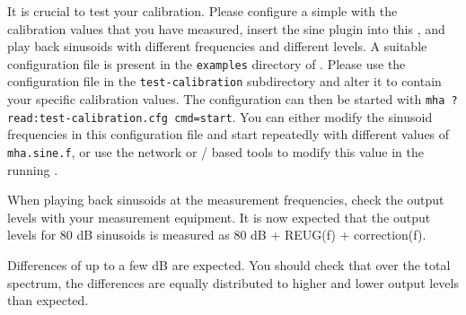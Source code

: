 \documentclass[11pt,a4paper,twoside]{article}
\newcommand{\+}{\discretionary{\mbox{\scriptsize$\hookleftarrow$}}{}{}}
\begin{document}
It is crucial to test your calibration. Please configure a simple \mha{} with the
calibration values that you have measured, insert the sine plugin into this \mha{},
and play back sinusoids with different frequencies and different levels.
%
A suitable configuration file is present in the \texttt{examples} directory of \mha{}.
%
Please use the configuration file in the \texttt{test-calibration} subdirectory
and alter it to contain your specific calibration values.
%
The configuration can then be started with
\texttt{mha ?read:test-calibration.cfg cmd=start}.
%
You can either modify the sinusoid frequencies in this configuration
file and start \mha{} repeatedly with different values of
\texttt{mha.sine.f}, or use the network or \Octave{}/\Matlab{} based
tools to modify this value in the running \mha{}.

When playing back sinusoids at the measurement frequencies, check the output levels with your
measurement equipment. It is now expected that the output levels for 80 dB sinusoids is measured as 80 dB + REUG(f) + correction(f).

Differences of up to a few dB are expected. You should check that over
the total spectrum, the differences are equally distributed to higher
and lower output levels than expected.



\printindex
\end{document}
